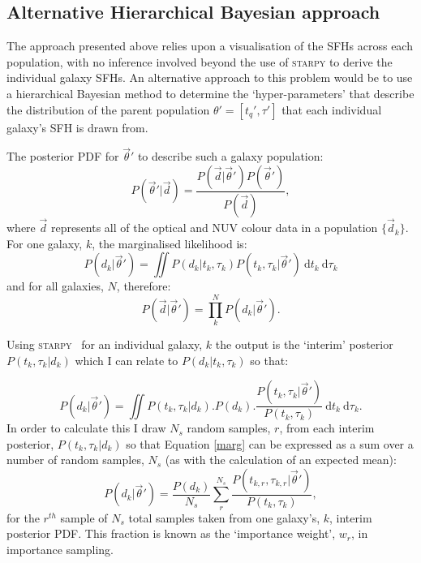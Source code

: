 \subsection{Alternative Hierarchical Bayesian approach}\label{althyper}

The approach presented above relies upon a visualisation of the SFHs across each population, with no inference involved beyond the use of \textsc{starpy} to derive the individual galaxy SFHs. An alternative approach to this problem would be to use a hierarchical Bayesian method to determine the `hyper-parameters' that describe the distribution of the parent population $\theta' = [t_q', \tau']$ that each individual galaxy's SFH is drawn from. 

The posterior PDF for $\vec{\theta}'$ to describe such a galaxy population:
\begin{equation}\label{hyper}
P(\vec{\theta}'|\vec{d}) = \frac{P(\vec{d}|\vec{\theta}')P(\vec{\theta}')}{P(\vec{d})}, 
\end{equation}
where $\vec{d}$ represents all of the optical and NUV colour data in a population $\{\vec{d}_k\}$. For one galaxy, $k$, the marginalised likelihood is:
\begin{equation}\label{one}
P(d_k|\vec{\theta}') = \iint \! P(d_k|t_k, \tau_k) P(t_k, \tau_k|\vec{\theta}') \ \mathrm{d}t_k ~ \mathrm{d}\tau_k
\end{equation}
and for all galaxies, $N$, therefore: 
\begin{equation}
P(\vec{d}|\vec{\theta}') = \prod_k^N P(d_k|\vec{\theta}').
\end{equation}

Using \textsc{starpy}~ for an individual galaxy, $k$ the output is the `interim' posterior $P(t_k, \tau_k|d_k)$ which I can relate to $P(d_k|t_k, \tau_k)$  so that:

\begin{equation}\label{marg}
P(d_k|\vec{\theta}') = \iint  \! P(t_k, \tau_k|d_k) . P(d_k) . \frac{P(t_k, \tau_k|\vec{\theta}')}{P(t_k, \tau_k)} \ \mathrm{d}t_k ~ \mathrm{d}\tau_k.
\end{equation}
In order to calculate this I draw $N_s$ random samples, $r$, from each interim posterior, $P(t_k, \tau_k|d_k)$ so that Equation \ref{marg} can be expressed as a sum over a number of random samples, $N_s$ (as with the calculation of an expected mean):
\begin{equation}\label{imp}
P(d_k|\vec{\theta}') = \frac{P(d_k)}{N_s} \sum_r^{N_s} \frac{P(t_{k,r}, \tau_{k,r}|\vec{\theta}')}{P(t_k, \tau_k)},
\end{equation}
for the $r^{th}$ sample of $N_s$ total samples taken from one galaxy's, $k$,  interim posterior PDF. This fraction is known as the `importance weight', $w_r$, in importance sampling. 


